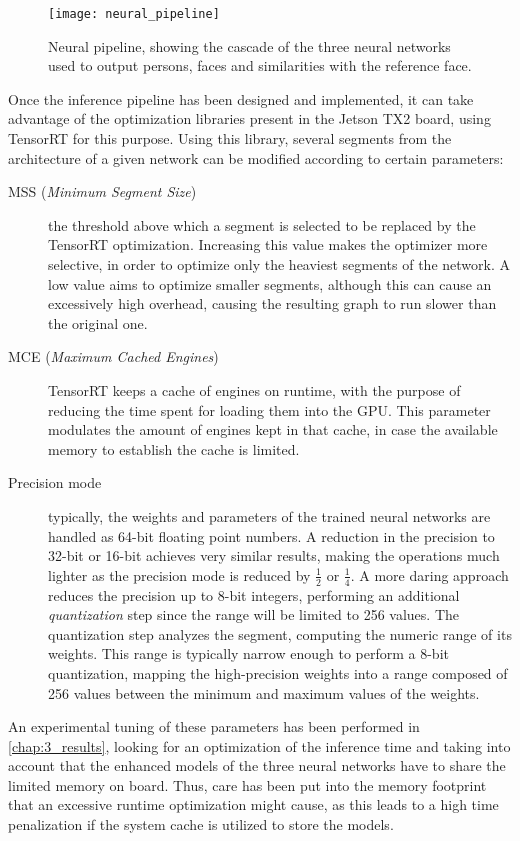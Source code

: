 \begin{figure}[h]
	\centering
	\texttt{[image: neural\_pipeline]}
	\caption{Neural pipeline, showing the cascade of the three neural networks used to output persons, faces and similarities with the reference face.}
	\label{fig:2_neural_pipeline}
\end{figure}


Once the inference pipeline has been designed and implemented, it can take advantage of the optimization libraries present in the Jetson TX2 board, using TensorRT for this purpose. Using this library, several segments from the architecture of a given network can be modified according to certain parameters:

\begin{description}
	\item[MSS (\textit{Minimum Segment Size})] the threshold above which a segment is selected to be replaced by the TensorRT optimization. Increasing this value makes the optimizer more selective, in order to optimize only the heaviest segments of the network. A low value aims to optimize smaller segments, although this can cause an excessively high overhead, causing the resulting graph to run slower than the original one. 
	\item[MCE (\textit{Maximum Cached Engines})] TensorRT keeps a cache of engines on runtime, with the purpose of reducing the time spent for loading them into the GPU. This parameter modulates the amount of engines kept in that cache, in case the available memory to establish the cache is limited.
	\item[Precision mode] typically, the weights and parameters of the trained neural networks are handled as 64-bit floating point numbers. A reduction in the precision to 32-bit or 16-bit achieves very similar results, making the operations much lighter as the precision mode is reduced by $\frac{1}{2}$ or $\frac{1}{4}$. A more daring approach reduces the precision up to 8-bit integers, performing an additional \textit{quantization} step since the range will be limited to 256 values. The quantization step analyzes the segment, computing the numeric range of its weights. This range is typically narrow enough to perform a 8-bit quantization, mapping the high-precision weights into a range composed of 256 values between the minimum and maximum values of the weights.
\end{description}

An experimental tuning of these parameters has been performed in \autoref{chap:3_results}, looking for an optimization of the inference time and taking into account that the enhanced models of the three neural networks have to share the limited memory on board. Thus, care has been put into the memory footprint that an excessive runtime optimization might cause, as this leads to a high time penalization if the system cache is utilized to store the models.\\


